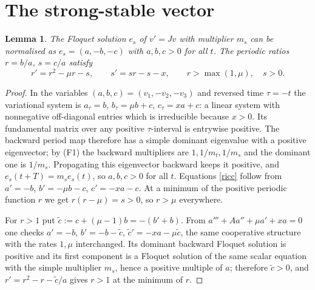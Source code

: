 \documentclass[11pt,a4paper]{article}
\newtheorem{lemma}[theorem]{Lemma}
\theoremstyle{remark}\newtheorem{remark}[theorem]{Remark}
\begin{document}
\section{The strong-stable vector}
\begin{lemma}\label{lem:es}
The Floquet solution $e_s$ of $v'=Jv$ with multiplier $m_s$ can be normalised as
$e_s=(a,-b,-c)$ with $a,b,c>0$ for all $t$. The periodic ratios $r=b/a$, $s=c/a$ satisfy
\begin{equation}\label{ricc}
r'=r^2-\mu r-s,\qquad s'=sr-s-x,\qquad r>\max(1,\mu),\quad s>0 .
\end{equation}
\end{lemma}
\begin{proof}
In the variables $(a,b,c)=(v_1,-v_2,-v_3)$ and reversed time $\tau=-t$ the variational system is
$a_\tau=b$, $b_\tau=\mu b+c$, $c_\tau=xa+c$: a linear system with nonnegative off-diagonal
entries which is irreducible because $x>0$. Its fundamental matrix over any positive
$\tau$-interval is entrywise positive. The backward period map therefore has a simple dominant
eigenvalue with a positive eigenvector; by (F1) the backward multipliers are $1,1/m_t,1/m_s$ and
the dominant one is $1/m_s$. Propagating this eigenvector backward keeps it positive, and
$e_s(t+T)=m_se_s(t)$, so $a,b,c>0$ for all $t$. Equations \eqref{ricc} follow from
$a'=-b$, $b'=-\mu b-c$, $c'=-xa-c$. At a minimum of the positive periodic function $r$ we get
$r(r-\mu)=s>0$, so $r>\mu$ everywhere.

For $r>1$ put $\tilde c:=c+(\mu-1)b=-(b'+b)$. From $a'''+Aa''+\mu a'+xa=0$ one checks
$a'=-b$, $b'=-b-\tilde c$, $\tilde c'=-xa-\mu\tilde c$, the same cooperative structure with the
rates $1,\mu$ interchanged. Its dominant backward Floquet solution is positive and its first
component is a Floquet solution of the same scalar equation with the simple multiplier $m_s$,
hence a positive multiple of $a$; therefore $\tilde c>0$, and $r'=r^2-r-\tilde c/a$ gives
$r>1$ at the minimum of $r$.
\end{proof}
\end{document}

